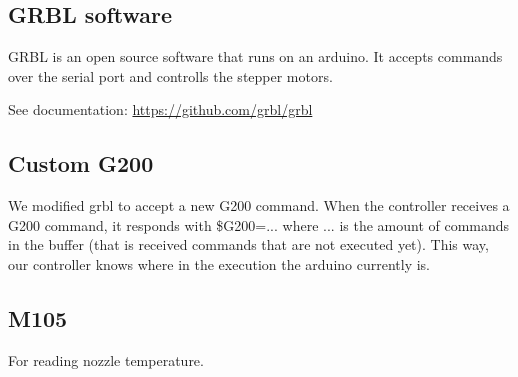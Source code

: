 \subsection{GRBL software}

GRBL is an open source software that runs on an arduino.
It accepts commands over the serial port and controlls the stepper motors.

See documentation: \url{https://github.com/grbl/grbl}

\subsection{Custom G200}

We modified grbl to accept a new G200 command.
When the controller receives a G200 command, it responds
with \$G200=... where ... is the amount of commands in the
buffer (that is received commands that are not executed yet).
This way, our controller knows where in the execution the arduino
currently is.

\subsection{M105}

For reading nozzle temperature.